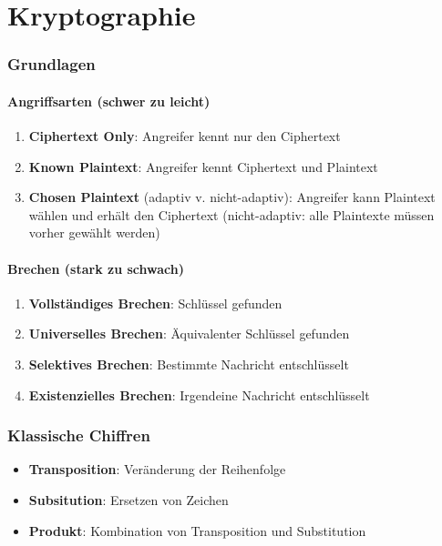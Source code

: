 \documentclass{article}
\author{Leopold Lemmermann}
\begin{document}
\createtitle

\part{Kryptographie}



\section{Grundlagen}
\subsection{Angriffsarten (schwer zu leicht)}
\begin{enumerate}
  \item \textbf{Ciphertext Only}: Angreifer kennt nur den Ciphertext
  \item \textbf{Known Plaintext}: Angreifer kennt Ciphertext und Plaintext
  \item \textbf{Chosen Plaintext} (adaptiv v. nicht-adaptiv): Angreifer kann Plaintext wählen und erhält den Ciphertext (nicht-adaptiv: alle Plaintexte müssen vorher gewählt werden)
\end{enumerate}

\subsection{Brechen (stark zu schwach)}
\begin{enumerate}
  \item \textbf{Vollständiges Brechen}: Schlüssel gefunden
  \item \textbf{Universelles Brechen}: Äquivalenter Schlüssel gefunden
  \item \textbf{Selektives Brechen}: Bestimmte Nachricht entschlüsselt
  \item \textbf{Existenzielles Brechen}: Irgendeine Nachricht entschlüsselt
\end{enumerate}




\section{Klassische Chiffren}
\begin{itemize}
  \item \textbf{Transposition}: Veränderung der Reihenfolge
  \item \textbf{Subsitution}: Ersetzen von Zeichen
  \item \textbf{Produkt}: Kombination von Transposition und Substitution
\end{itemize}
\end{document}
